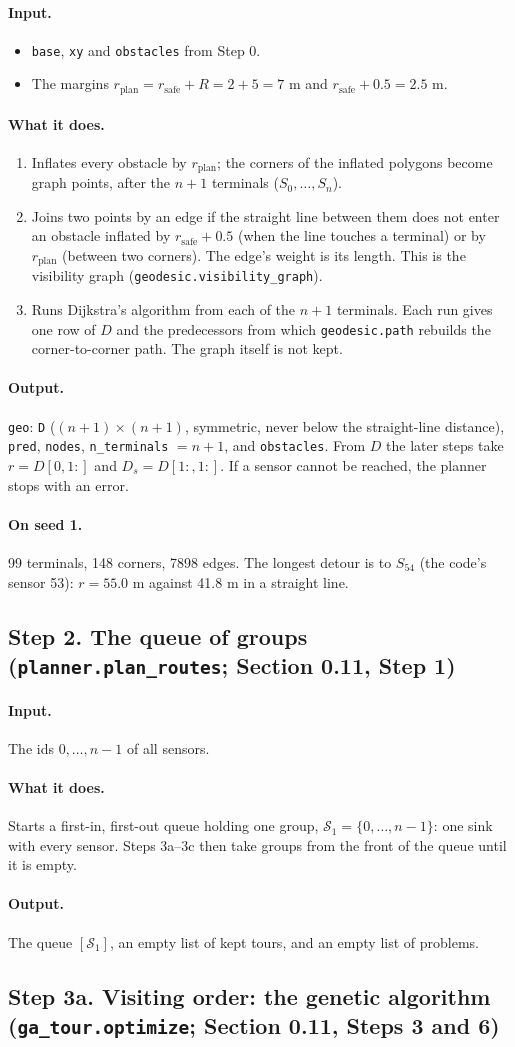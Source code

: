 \documentclass[10pt]{article}
\newcommand{\code}[1]{\texttt{#1}}
\newcommand{\rplan}{r_{\mathrm{plan}}}
\newcommand{\rsafe}{r_{\mathrm{safe}}}
\newcommand{\inputs}{\paragraph{Input.}}
\newcommand{\does}{\paragraph{What it does.}}
\newcommand{\outputs}{\paragraph{Output.}}
\newcommand{\seedone}{\paragraph{On seed 1.}}
\begin{document}
\inputs
\begin{itemize}
  \item \code{base}, \code{xy} and \code{obstacles} from Step 0.
  \item The margins $\rplan = \rsafe + R = 2 + 5 = 7$ m and $\rsafe + 0.5 = 2.5$ m.
\end{itemize}
\does
\begin{enumerate}
  \item Inflates every obstacle by $\rplan$; the corners of the inflated polygons become graph points, after the $n+1$
    terminals ($S_0, \dots, S_n$).
  \item Joins two points by an edge if the straight line between them does not enter an obstacle inflated by
    $\rsafe + 0.5$ (when the line touches a terminal) or by $\rplan$ (between two corners). The edge's weight is its
    length. This is the visibility graph (\code{geodesic.visibility\_graph}).
  \item Runs Dijkstra's algorithm from each of the $n+1$ terminals. Each run gives one row of $D$ and the predecessors
    from which \code{geodesic.path} rebuilds the corner-to-corner path. The graph itself is not kept.
\end{enumerate}
\outputs
\code{geo}: \code{D} ($(n{+}1)\times(n{+}1)$, symmetric, never below the straight-line distance), \code{pred},
\code{nodes}, \code{n\_terminals} $= n+1$, and \code{obstacles}. From $D$ the later steps take $r = D[0,1{:}]$ and
$D_s = D[1{:},1{:}]$. If a sensor cannot be reached, the planner stops with an error.
\seedone 99 terminals, 148 corners, 7898 edges. The longest detour is to $S_{54}$ (the code's sensor 53): $r = 55.0$ m against 41.8 m
in a straight line.

\subsection*{Step 2. The queue of groups (\code{planner.plan\_routes}; Section 0.11, Step 1)}

\inputs The ids $0, \dots, n-1$ of all sensors.
\does Starts a first-in, first-out queue holding one group, $\mathcal{S}_1 = \{0, \dots, n-1\}$: one sink with every
sensor. Steps 3a--3c then take groups from the front of the queue until it is empty.
\outputs The queue $[\mathcal{S}_1]$, an empty list of kept tours, and an empty list of problems.

\subsection*{Step 3a. Visiting order: the genetic algorithm (\code{ga\_tour.optimize}; Section 0.11, Steps 3 and 6)}
\end{document}

